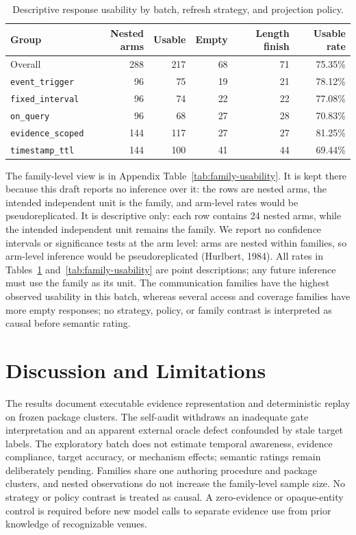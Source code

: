 \documentclass[11pt]{article}
\begin{document}
\begin{table}[h]
\centering
\caption{Descriptive response usability by batch, refresh strategy, and projection policy.}
\label{tab:usability}
\small
\begin{tabular}{lrrrrr}
\toprule
Group & Nested arms & Usable & Empty & Length finish & Usable rate \\
\midrule
Overall & 288 & 217 & 68 & 71 & 75.35\% \\
\texttt{event\_trigger} & 96 & 75 & 19 & 21 & 78.12\% \\
\texttt{fixed\_interval} & 96 & 74 & 22 & 22 & 77.08\% \\
\texttt{on\_query} & 96 & 68 & 27 & 28 & 70.83\% \\
\texttt{evidence\_scoped} & 144 & 117 & 27 & 27 & 81.25\% \\
\texttt{timestamp\_ttl} & 144 & 100 & 41 & 44 & 69.44\% \\
\bottomrule
\end{tabular}
\end{table}

The family-level view is in Appendix Table~\ref{tab:family-usability}. It is kept there because this draft reports no inference over it: the rows are nested arms, the intended independent unit is the family, and arm-level rates would be pseudoreplicated. It is descriptive only: each row contains 24 nested arms, while the intended independent unit remains the family. We report no confidence intervals or significance tests at the arm level: arms are nested within families, so arm-level inference would be pseudoreplicated (Hurlbert, 1984). All rates in Tables~\ref{tab:usability} and~\ref{tab:family-usability} are point descriptions; any future inference must use the family as its unit. The communication families have the highest observed usability in this batch, whereas several access and coverage families have more empty responses; no strategy, policy, or family contrast is interpreted as causal before semantic rating.



\section{Discussion and Limitations}
The results document executable evidence representation and deterministic replay on frozen package clusters. The self-audit withdraws an inadequate gate interpretation and an apparent external oracle defect confounded by stale target labels. The exploratory batch does not estimate temporal awareness, evidence compliance, target accuracy, or mechanism effects; semantic ratings remain deliberately pending. Families share one authoring procedure and package clusters, and nested observations do not increase the family-level sample size. No strategy or policy contrast is treated as causal. A zero-evidence or opaque-entity control is required before new model calls to separate evidence use from prior knowledge of recognizable venues.
\end{document}
